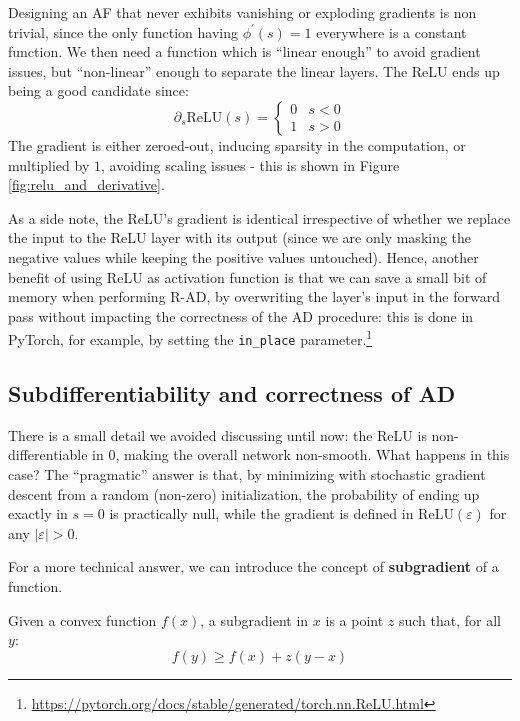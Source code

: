 Designing an AF that never exhibits vanishing or exploding gradients is non trivial, since the only function having $\phi^\prime(s)=1$ everywhere is a constant function. We then need a function which is “linear enough” to avoid gradient issues, but “non-linear” enough to separate the linear layers. The ReLU ends up being a good candidate since:
%
$$
\partial_s \text{ReLU}(s)=\begin{cases} 0 & s < 0 \\ 1 & s >0 \end{cases}
$$
%
The gradient is either zeroed-out, inducing sparsity in the computation, or multiplied by $1$, avoiding scaling issues - this is shown in Figure \ref{fig:relu_and_derivative}.

As a side note, the ReLU’s gradient is identical irrespective of whether we replace the input to the ReLU layer with its output (since we are only masking the negative values while keeping the positive values untouched). Hence, another benefit of using ReLU as activation function is that we can save a small bit of memory when performing R-AD, by overwriting the layer’s input in the forward pass without impacting the correctness of the AD procedure: this is done in PyTorch, for example, by setting the {\footnotesize\verb+in_place+} parameter.\footnote{\url{https://pytorch.org/docs/stable/generated/torch.nn.ReLU.html}}

\subsection{Subdifferentiability and correctness of AD}
\label{subsec:subdifferentiability}

\addteacup There is a small detail we avoided discussing until now: the ReLU is non-differentiable in $0$, making the overall network non-smooth. What happens in this case? The “pragmatic” answer is that, by minimizing with stochastic gradient descent from a random (non-zero) initialization, the probability of ending up exactly in $s=0$ is practically null, while the gradient is defined in $\text{ReLU}(\varepsilon)$ for any $\lvert\varepsilon\rvert>0$.

For a more technical answer, we can introduce the concept of \textbf{subgradient} of a function.

\begin{definition}[Subgradient]
%
Given a convex function $f(x)$, a subgradient in $x$ is a point $z$ such that, for all $y$:
%
$$
f(y) \ge f(x)+z(y-x)
$$
%
\end{definition}

